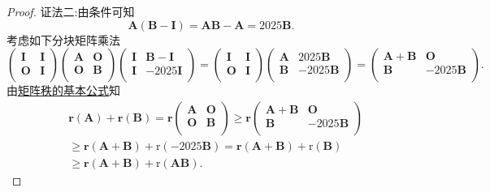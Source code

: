 \documentclass[../../main.tex]{subfiles}%
\begin{document}
\begin{proof}
{\color{blue}证法二:}由条件可知
$$\boldsymbol{A}\left( \boldsymbol{B}-\boldsymbol{I} \right) =\boldsymbol{AB}-\boldsymbol{A}=2025\boldsymbol{B}.$$
考虑如下分块矩阵乘法
$$\left( \begin{matrix}
\boldsymbol{I}&		\boldsymbol{I}\\
\boldsymbol{O}&		\boldsymbol{I}\\
\end{matrix} \right) \left( \begin{matrix}
\boldsymbol{A}&		\boldsymbol{O}\\
\boldsymbol{O}&		\boldsymbol{B}\\
\end{matrix} \right) \left( \begin{matrix}
\boldsymbol{I}&		\boldsymbol{B}-\boldsymbol{I}\\
\boldsymbol{I}&		-2025\boldsymbol{I}\\
\end{matrix} \right) =\left( \begin{matrix}
\boldsymbol{I}&		\boldsymbol{I}\\
\boldsymbol{O}&		\boldsymbol{I}\\
\end{matrix} \right) \left( \begin{matrix}
\boldsymbol{A}&		2025\boldsymbol{B}\\
\boldsymbol{B}&		-2025\boldsymbol{B}\\
\end{matrix} \right) =\left( \begin{matrix}
\boldsymbol{A}+\boldsymbol{B}&		\boldsymbol{O}\\
\boldsymbol{B}&		-2025\boldsymbol{B}\\
\end{matrix} \right) .$$
由\hyperref[proposition:矩阵秩的基本公式]{矩阵秩的基本公式}知
\begin{align*}
&\mathbf{r}\left( \boldsymbol{A} \right) +\mathbf{r}\left( \boldsymbol{B} \right) =\mathbf{r}\left( \begin{matrix}
\boldsymbol{A}&		\boldsymbol{O}\\
\boldsymbol{O}&		\boldsymbol{B}\\
\end{matrix} \right) \geqslant \mathbf{r}\left( \begin{matrix}
\boldsymbol{A}+\boldsymbol{B}&		\boldsymbol{O}\\
\boldsymbol{B}&		-2025\boldsymbol{B}\\
\end{matrix} \right) 
\\
&\geqslant \mathbf{r}\left( \boldsymbol{A}+\boldsymbol{B} \right) +\mathrm{r}\left( -2025\boldsymbol{B} \right) =\mathbf{r}\left( \boldsymbol{A}+\boldsymbol{B} \right) +\mathrm{r}\left( \boldsymbol{B} \right) 
\\
&\geqslant \mathbf{r}\left( \boldsymbol{A}+\boldsymbol{B} \right) +\mathrm{r}\left( \boldsymbol{AB} \right) .
\end{align*}

\end{proof}
\end{document}
